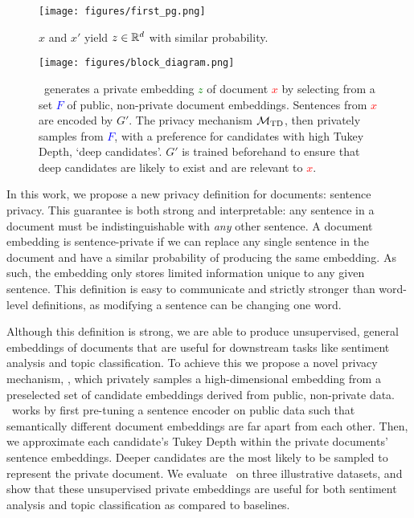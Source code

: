 \begin{figure}
	\centering
	\texttt{[image: figures/first\_pg.png]}
	\label{fig:first page}
	\vspace{0cm}
	\caption{$x$ and $x'$ yield $z \in {\mathbb R}^d$ with similar probability.}
\end{figure}
 
\begin{figure*}
	\centering
	\vspace{-1cm}
	\texttt{[image: figures/block\_diagram.png]}
	\label{fig:block diagram}
	\vspace{-0.65cm}
	\caption[\technique\ generates a private embedding $z$ of document $x$ by selecting from a set $F$ of public, non-private document embeddings.]{\technique\ generates a private embedding \textcolor{green}{$z$} of document \textcolor{red}{$x$} by selecting from a set \textcolor{blue}{$F$} of public, non-private document embeddings. Sentences from \textcolor{red}{$x$} are encoded by $G'$. The privacy mechanism $\mathcal{M}_{\text{TD}}$, then privately samples from \textcolor{blue}{$F$}, with a preference for candidates with high Tukey Depth, `deep candidates'. $G'$ is trained beforehand to ensure that deep candidates are likely to exist and are relevant to \textcolor{red}{$x$}.}
\end{figure*}

In this work, we propose a new privacy definition for documents: sentence privacy. This guarantee is both strong and interpretable: any sentence in a document must be indistinguishable with \emph{any} other sentence. A document embedding is sentence-private if we can replace any single sentence in the document and have a similar probability of producing the same embedding. As such, the embedding only stores limited information unique to any given sentence. This definition is easy to communicate and strictly stronger than word-level definitions, as modifying a sentence can be changing one word.

Although this definition is strong, we are able to produce unsupervised, general embeddings of documents that are useful for downstream tasks like sentiment analysis and topic classification. To achieve this we propose a novel privacy mechanism, \technique, which privately samples a high-dimensional embedding from a preselected set of candidate embeddings derived from public, non-private data. \technique\  works by first pre-tuning a sentence encoder on public data such that semantically different document embeddings are far apart from each other. Then, we approximate each candidate's Tukey Depth within the private documents' sentence embeddings. Deeper candidates are the most likely to be sampled to represent the private document. We evaluate \technique\  on three illustrative datasets, and show that these unsupervised private embeddings are useful for both sentiment analysis and topic classification as compared to baselines. 

